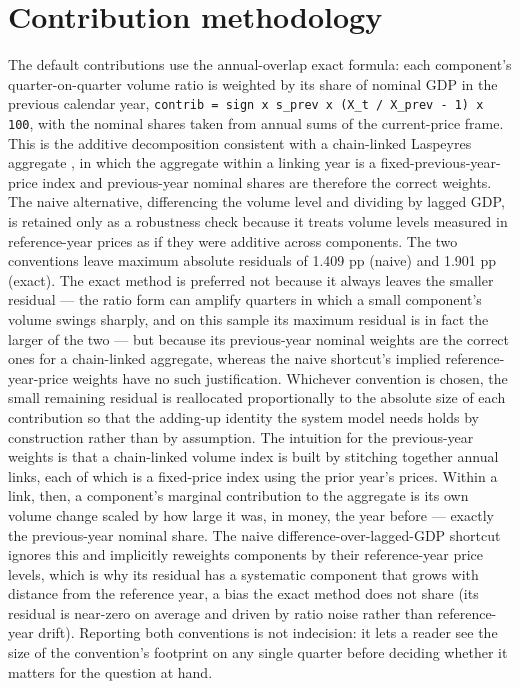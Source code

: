 \documentclass[11pt,a4paper]{article}
\begin{document}
\section{Contribution methodology}
The default contributions use the annual-overlap exact formula: each component's quarter-on-quarter volume ratio is weighted by its share of nominal GDP in the previous calendar year, \texttt{contrib = sign x s\_prev x (X\_t / X\_prev - 1) x 100}, with the nominal shares taken from annual sums of the current-price frame. This is the additive decomposition consistent with a chain-linked Laspeyres aggregate \cite{eurostatqna}, in which the aggregate within a linking year is a fixed-previous-year-price index and previous-year nominal shares are therefore the correct weights. The naive alternative, differencing the volume level and dividing by lagged GDP, is retained only as a robustness check because it treats volume levels measured in reference-year prices as if they were additive across components. The two conventions leave maximum absolute residuals of 1.409 pp (naive) and 1.901 pp (exact). The exact method is preferred not because it always leaves the smaller residual --- the ratio form can amplify quarters in which a small component's volume swings sharply, and on this sample its maximum residual is in fact the larger of the two --- but because its previous-year nominal weights are the correct ones for a chain-linked aggregate, whereas the naive shortcut's implied reference-year-price weights have no such justification. Whichever convention is chosen, the small remaining residual is reallocated proportionally to the absolute size of each contribution so that the adding-up identity the system model needs holds by construction rather than by assumption.
The intuition for the previous-year weights is that a chain-linked volume index is built by stitching together annual links, each of which is a fixed-price index using the prior year's prices. Within a link, then, a component's marginal contribution to the aggregate is its own volume change scaled by how large it was, in money, the year before --- exactly the previous-year nominal share. The naive difference-over-lagged-GDP shortcut ignores this and implicitly reweights components by their reference-year price levels, which is why its residual has a systematic component that grows with distance from the reference year, a bias the exact method does not share (its residual is near-zero on average and driven by ratio noise rather than reference-year drift). Reporting both conventions is not indecision: it lets a reader see the size of the convention's footprint on any single quarter before deciding whether it matters for the question at hand.
\end{document}
